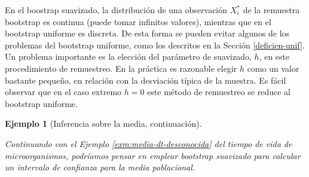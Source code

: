 \documentclass[
  spanish,
  10pt,
]{book}
\theoremstyle{break}
\newtheorem{example}{Ejemplo}[chapter]
\theoremstyle{nonumberplain}
\begin{document}
En el boostrap suavizado, la distribución de una observación \(X_i^{\ast}\) de la remuestra bootstrap es continua (puede tomar infinitos valores), mientras que en el bootstrap uniforme es discreta.
De esta forma se pueden evitar algunos de los problemas del bootstrap uniforme, como los descritos en la Sección \ref{deficien-unif}.
Un problema importante es la elección del parámetro de suavizado, \(h\), en este procedimiento de remuestreo.
En la práctica es razonable elegir \(h\) como un valor bastante pequeño, en relación con la desviación típica de la muestra.
Es fácil observar que en el caso extremo \(h=0\) este método de remuestreo se reduce al bootstrap uniforme.

\begin{example}[Inferencia sobre la media, continuación]
\protect\hypertarget{exm:media-suav}{}\label{exm:media-suav}

Continuando con el Ejemplo \ref{exm:media-dt-desconocida} del tiempo de vida de microorganismos, podríamos pensar en emplear bootstrap suavizado para calcular un intervalo de confianza para la media poblacional.


\end{example}
\end{document}
